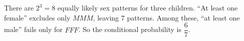 There are $2^3=8$ equally likely sex patterns for three children. ``At least one female'' excludes only $MMM$, leaving $7$ patterns. Among these, ``at least one male'' fails only for $FFF$. So the conditional probability is $\boxed{\dfrac{6}{7}}$.
